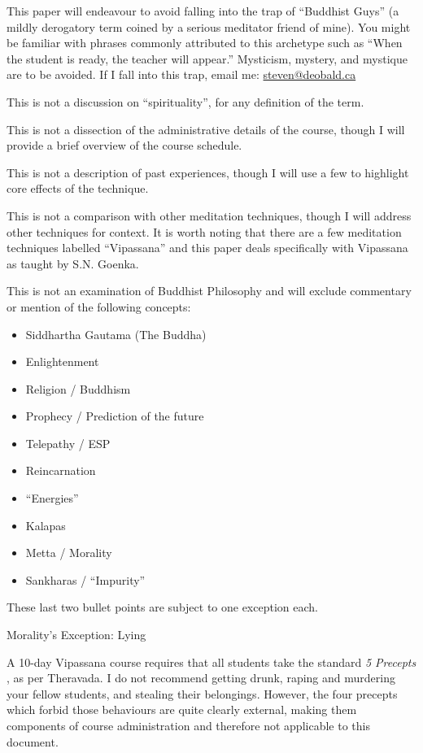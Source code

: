 \documentclass{article}
\begin{document}
This paper will endeavour to avoid falling into the trap of ``Buddhist Guys'' (a mildly derogatory term coined by a serious meditator friend of mine). You might be familiar with phrases commonly attributed to this archetype such as ``When the student is ready, the teacher will appear.'' Mysticism, mystery, and mystique are to be avoided. If I fall into this trap, email me: \href{mailto:steven@deobald.ca}{steven@deobald.ca}

This is not a discussion on ``spirituality'', for any definition of the term.

This is not a dissection of the administrative details of the course, though I will provide a brief overview of the course schedule.

This is not a description of past experiences, though I will use a few to highlight core effects of the technique.

This is not a comparison with other meditation techniques, though I will address other techniques for context. It is worth noting that there are a few meditation techniques labelled ``Vipassana'' and this paper deals specifically with Vipassana as taught by S.N. Goenka.

This is not an examination of Buddhist Philosophy and will exclude commentary or mention of the following concepts:

\begin{itemize}
  \item Siddhartha Gautama (The Buddha)
  \item Enlightenment
  \item Religion / Buddhism
  \item Prophecy / Prediction of the future
  \item Telepathy / ESP
  \item Reincarnation
  \item ``Energies''
  \item Kalapas
  \item Metta / Morality
  \item Sankharas / ``Impurity''
\end{itemize}

These last two bullet points are subject to one exception each.

\pagebreak

\begin{center}
  \LARGE{Morality's Exception: Lying}
\end{center}

A 10-day Vipassana course requires that all students take the standard \textit{5 Precepts} \cite{fiveprecepts}, as per Theravada. I do not recommend getting drunk, raping and murdering your fellow students, and stealing their belongings. However, the four precepts which forbid those behaviours are quite clearly external, making them components of course administration and therefore not applicable to this document.
\end{document}
